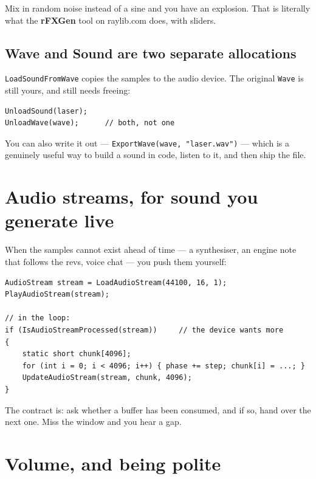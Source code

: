 Mix in random noise instead of a sine and you have an explosion. That is
literally what the \textbf{rFXGen} tool on raylib.com does, with sliders.


\subsection{Wave and Sound are two separate allocations}

\lstinline|LoadSoundFromWave| copies the samples to the audio device. The
original \lstinline|Wave| is still yours, and still needs freeing:

\begin{lstlisting}
UnloadSound(laser);
UnloadWave(wave);      // both, not one
\end{lstlisting}

You can also write it out --- \lstinline|ExportWave(wave, "laser.wav")| --- which
is a genuinely useful way to build a sound in code, listen to it, and then ship
the file.

\section{Audio streams, for sound you generate live}

When the samples cannot exist ahead of time --- a synthesiser, an engine note
that follows the revs, voice chat --- you push them yourself:

\begin{lstlisting}
AudioStream stream = LoadAudioStream(44100, 16, 1);
PlayAudioStream(stream);

// in the loop:
if (IsAudioStreamProcessed(stream))     // the device wants more
{
    static short chunk[4096];
    for (int i = 0; i < 4096; i++) { phase += step; chunk[i] = ...; }
    UpdateAudioStream(stream, chunk, 4096);
}
\end{lstlisting}

The contract is: ask whether a buffer has been consumed, and if so, hand over the
next one. Miss the window and you hear a gap.

\section{Volume, and being polite}

